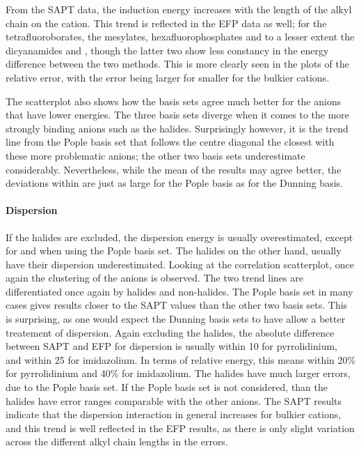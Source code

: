 \begin{footnotesize}
From the SAPT data, the induction energy increases with the length of the alkyl chain on the cation. 
This trend is reflected in the EFP data as well; for the tetrafluoroborates, the mesylates, hexafluorophosphates and to a lesser extent the dicyanamides and \ntf, though the latter two show less constancy in the energy difference between the two methods.
This is more clearly seen in the plots of the relative error, with the error being larger for smaller for the bulkier cations.

The scatterplot also shows how the basis sets agree much better for the anions that have lower energies.
The three basis sets diverge when it comes to the more strongly binding anions such as the halides.
Surprisingly however, it is the trend line from the Pople basis set that follows the centre diagonal the closest with these more problematic anions; the other two basis sets underestimate considerably.
Nevertheless, while the mean of the results may agree better, the deviations within are just as large for the Pople basis as for the Dunning basis.


\paragraph{Dispersion}
If the halides are excluded, the dispersion energy is usually overestimated, except for \bfl and \pf when using the Pople basis set. 
The halides on the other hand, usually have their dispersion underestimated.
Looking at the correlation scatterplot, once again the clustering of the anions is observed.
The two trend lines are differentiated once again by halides and non-halides. 
The Pople basis set in many cases gives results closer to the SAPT values than the other two basis sets.
This is surprising, as one would expect the Dunning basis sets to have allow a better treatement of dispersion.
Again excluding the halides, the absolute difference between SAPT and EFP for dispersion is usually within 10 \enUnit for pyrrolidinium, and within 25 \enUnit for imidazolium.
In terms of relative energy, this means within 20\% for pyrrolidinium and 40\% for imidazolium.
The halides have much larger errors, due to the Pople basis set. 
If the Pople basis set is not considered, than the halides have error ranges comparable with the other anions.
The SAPT results indicate that the dispersion interaction in general increases for bulkier cations, and this trend is well reflected in the EFP results, as there is only slight variation across the different alkyl chain lengths in the errors. 



\end{footnotesize}
